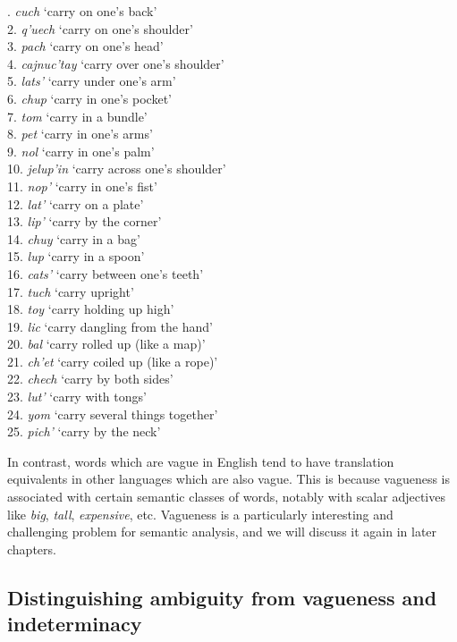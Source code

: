 . \textit{cuch} ‘carry on one’s back’\\
2. \textit{q'uech} ‘carry on one’s shoulder’ \\
3. \textit{pach} ‘carry on one’s head’ \\
4. \textit{cajnuc'tay} ‘carry over one’s shoulder’\\
5. \textit{lats'} ‘carry under one’s arm’\\
6. \textit{chup} ‘carry in one’s pocket’\\
7. \textit{tom} ‘carry in a bundle’\\
8. \textit{pet} ‘carry in one’s arms’\\
9. \textit{nol} ‘carry in one’s palm’\\
10. \textit{jelup'in} ‘carry across one’s shoulder’\\
11. \textit{nop'} ‘carry in one’s fist’\\
12. \textit{lat'} ‘carry on a plate’\\
13. \textit{lip'} ‘carry by the corner’\\
14. \textit{chuy} ‘carry in a bag’\\
15. \textit{lup} ‘carry in a spoon’\\
16. \textit{cats'} ‘carry between one’s teeth’\\
17. \textit{tuch} ‘carry upright’\\
18. \textit{toy} ‘carry holding up high’\\
19. \textit{lic} ‘carry dangling from the hand’\\
20. \textit{bal} ‘carry rolled up (like a map)’\\
21. \textit{ch'et} ‘carry coiled up (like a rope)’\\
22. \textit{chech} ‘carry by both sides’\\
23. \textit{lut'} ‘carry with tongs’\\
24. \textit{yom} ‘carry several things together’\\
25. \textit{pich'} ‘carry by the neck’
\z


In contrast, words which are vague in English tend to have translation equivalents in other languages which are also vague. This is because vagueness is associated with certain semantic classes of words, notably with scalar adjectives like \textit{big}, \textit{tall}, \textit{expensive}, etc. Vagueness is a particularly interesting and challenging problem for semantic analysis, and we will discuss it again in later chapters.


\subsection{Distinguishing ambiguity from vagueness and indeterminacy}\label{sec:} %

